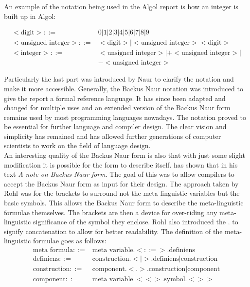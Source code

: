 \documentclass{article}
\begin{document}
An example of the notation being used in the Algol report is how an integer is built up in Algol:

\begin{equation} \label{eq3}
	\begin{split}
	<\text{digit}> ::=&0|1|2|3|4|5|6|7|8|9 \\
	<\text{unsigned integer}> ::=&<\text{digit}>|<\text{unsigned integer}><\text{digit}> \\
	<\text{integer}> ::=&<\text{unsigned integer}>|+<\text{unsigned integer}>|\\&-<\text{unsigned integer}>
	\end{split}
\end{equation}

Particularly the last part was introduced by Naur to clarify the notation and make it more accessible. Generally, the Backus Naur notation was introduced to give the report a formal reference language. It has since been adapted and changed for multiple uses and an extended version of the Backus Naur form remains used by most programming languages nowadays. The notation proved to be essential for further language and compiler design. The clear vision and simplicity has remained and has allowed further generations of computer scientists to work on the field of language design.
\\
An interesting quality of the Backus Naur form is also that with just some slight modification it is possible for the form to describe itself. \citet{rohl1968note} has shown that in his text \textit{A note on Backus Naur form}. The goal of this was to allow compilers to accept the Backus Naur form as input for their design. The approach taken by Rohl was for the brackets to surround not the meta-linguistic variables but the basic symbols. This allows the Backus Naur form to describe the meta-linguistic formulae themselves. The brackets are then a device for over-riding any meta-linguistic significance of the symbol they enclose. Rohl also introduced the $.$ to signify concatenation to allow for better readability.
The definition of the meta-linguistic formulae goes as follows:
\begin{equation} \label{eq4}
\begin{split}
	\text{meta formula} ::=& \text{meta variable}.<::=>.\text{definiens} \\
	\text{definiens} ::=& \text{construction}.<|>.\text{definiens} | \text{construction} \\
	\text{construction} ::=& \text{component}.<.>.\text{construction} | \text{component} \\
	\text{component} ::=& \text{meta variable} | <<>.\text{symbol}.<>> \\
\end{split}
\end{equation}
\end{document}
